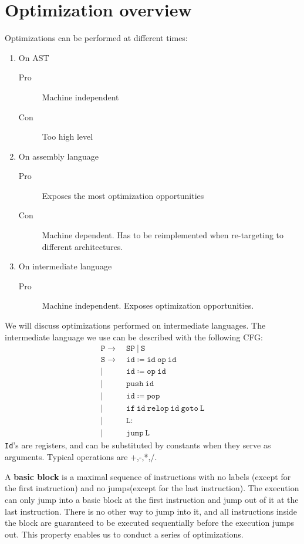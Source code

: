 \section{Optimization overview}
Optimizations can be performed at different times:
\begin{enumerate}
\item On AST
\begin{description}
\item[Pro]Machine independent
\item[Con]Too high level
\end{description}
\item On assembly language
\begin{description}
\item[Pro]Exposes the most optimization opportunities
\item[Con]Machine dependent. Has to be reimplemented when re-targeting to different architectures.
\end{description}
\item {\color{red}On intermediate language}
\begin{description}
\item[Pro]Machine independent. Exposes optimization opportunities.
\end{description}
\end{enumerate}
We will discuss optimizations performed on intermediate languages. The intermediate language we use can be described with the following CFG:
\begin{align*}
\mathtt{P\rightarrow\:}&\mathtt{SP\:|\:S}\\
\mathtt{S\rightarrow\:}&\mathtt{id\coloneqq id\:op\:id}\\
|\:&\mathtt{id\coloneqq op\:id}\\
|\:&\mathtt{push\:id}\\
|\:&\mathtt{id\coloneqq pop}\\
|\:&\mathtt{if\:id\:relop\:id\:goto\:L}\\
|\:&\mathtt{L:}\\
|\:&\mathtt{jump\:L}
\end{align*}
\texttt{Id}'s are registers, and can be substituted by constants when they serve as arguments. Typical operations are {\color{red}+,-,*,/}. 

A \textbf{basic block} is a maximal sequence of instructions with no labels (except for the first instruction) and no jumps(except for the last instruction). The execution can only jump into a basic block at the first instruction and jump out of it at the last instruction. There is no other way to jump into it, and all instructions inside the block are guaranteed to be executed sequentially before the execution jumps out. This property enables us to conduct a series of optimizations.

